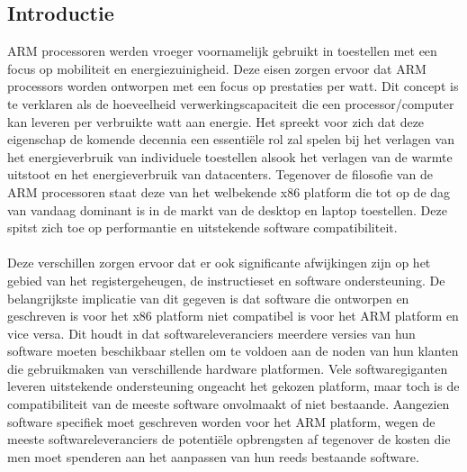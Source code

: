 \documentclass[a0,portrait]{a0poster}
\begin{document}
\begin{multicols}{2}
\section*{Introductie}
\color{black}
\color{black}
ARM processoren werden vroeger voornamelijk gebruikt in toestellen met een focus op mobiliteit en energiezuinigheid. Deze eisen zorgen ervoor dat ARM processors worden ontworpen met een focus op prestaties per watt. Dit concept is te verklaren als de hoeveelheid verwerkingscapaciteit die een processor/computer kan leveren per verbruikte watt aan energie. Het spreekt voor zich dat deze eigenschap de komende decennia een essentiële rol zal spelen bij het verlagen van het energieverbruik van individuele toestellen alsook het verlagen van de warmte uitstoot en het energieverbruik van datacenters. Tegenover de filosofie van de ARM processoren staat deze van het welbekende x86 platform die tot op de dag van vandaag dominant is in de markt van de desktop en laptop toestellen. Deze spitst zich toe op performantie en uitstekende software compatibiliteit.\\\\Deze verschillen zorgen ervoor dat er ook significante afwijkingen zijn op het gebied van het registergeheugen, de instructieset en software ondersteuning. De belangrijkste implicatie van dit gegeven is dat software die ontworpen en geschreven is voor het x86 platform niet compatibel is voor het ARM platform en vice versa. Dit houdt in dat softwareleveranciers meerdere versies van hun software moeten beschikbaar stellen om te voldoen aan de noden van hun klanten die gebruikmaken van verschillende hardware platformen. Vele softwaregiganten leveren uitstekende ondersteuning ongeacht het gekozen platform, maar toch is de compatibiliteit van de meeste software onvolmaakt of niet bestaande. Aangezien software specifiek moet geschreven worden voor het ARM platform, wegen de meeste softwareleveranciers de potentiële opbrengsten af tegenover de kosten die men moet spenderen aan het aanpassen van hun reeds bestaande software.


\color{Black} %
\color{HoGentAccent1} 

\end{multicols}
\end{document}
